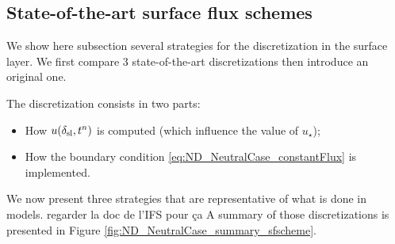 \subsection{State-of-the-art surface flux schemes}
\label{sec:ND_NeutralCase_strategies}
We show here subsection several strategies for the
discretization in the surface layer. We first compare 3
state-of-the-art discretizations then introduce an original one.

The discretization consists in two parts:
\begin{itemize}
	\item How $u(\delta_{\rm sl}, t^n)$ is computed
		(which influence the value of $u_\star$);
	\item How the boundary condition 
		\eqref{eq:ND_NeutralCase_constantFlux} is implemented.
\end{itemize}
  We now present three strategies that are representative of
  what is done in models.
  {\color{red} regarder la doc de l'IFS pour ça}
  A summary of those discretizations
  is presented in Figure \ref{fig:ND_NeutralCase_summary_sfscheme}.
